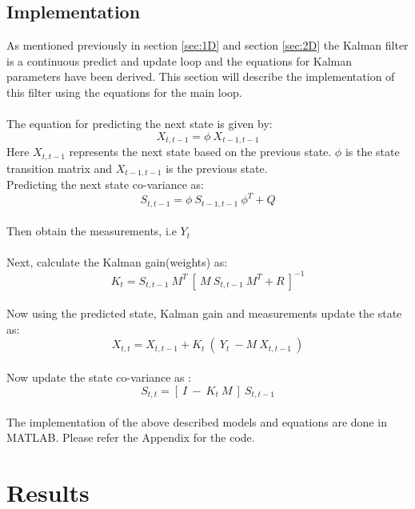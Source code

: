 \documentclass[12pt]{article}
\begin{document}
\subsection{Implementation}
\label{sec:implementation}
As mentioned previously in section \ref{sec:1D} and section \ref{sec:2D} the Kalman filter is a continuous predict and update loop and the equations for Kalman parameters have been derived. This section will describe the implementation of this filter using the equations for the main loop.\\
\\
The equation for predicting the next state is given by:
\begin{equation}
	X_{t,t-1} = \phi\  X_{t-1,t-1}
\label{eq:imp predict}
\end{equation}
Here $X_{t,t-1}$ represents the next state based on the previous state. $\phi$ is the state transition matrix and $X_{t-1,t-1}$ is the previous state.
\\
Predicting the next state co-variance as:
\begin{equation}
	S_{t,t-1} = \phi\  S_{t-1,t-1}\ \phi^T + Q
\label{eq:imp predict state co-var}
\end{equation}
\\
Then obtain the measurements, i.e $Y_t$ \\
\\
Next, calculate the Kalman gain(weights) as:
\begin{equation}
	K_t = S_{t,t-1}\ M^T\ [\ M\ S_{t,t-1}\ M^T + R\ ]^{-1}
\label{eq:imp kalman gain}
\end{equation}
\\
Now using the predicted state, Kalman gain and measurements update the state as:
\begin{equation}
	X_{t,t} = X_{t,t-1} + K_t\ (\ Y_t\ - M\ X_{t,t-1}\ )
\label{eq:imp state update}
\end{equation}
\\
Now update the state co-variance as :
\begin{equation}
	S_{t,t} = [\ I\ -\ K_t\ M\ ]\ S_{t,t-1}
\label{eq:imp state co-var update}
\end{equation}
\\
The implementation of the above described models and equations are done in MATLAB. Please refer the Appendix for the code.  
\section{Results}
\end{document}
